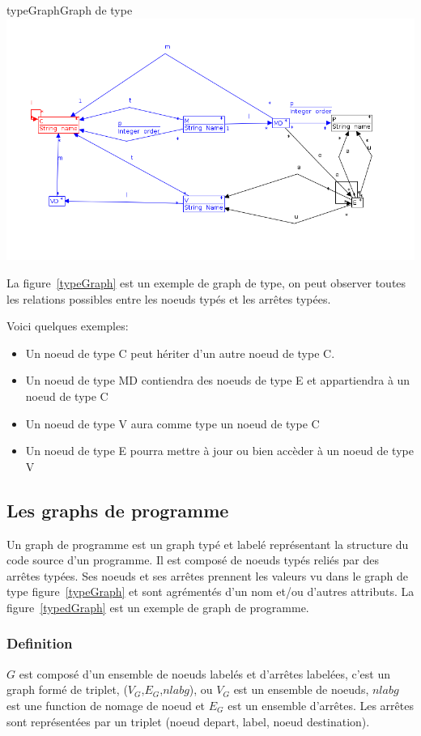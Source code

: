 \documentclass[a4paper, 12pt]{article}
\begin{document}
\begin{myfig}{typeGraph}{Graph de type}
\includegraphics[width=\textwidth]{typeGraph.png}
\end{myfig}

La figure~\ref{typeGraph} est un exemple de graph de type, on peut observer toutes les relations possibles entre les noeuds typés et les arrêtes typées.

Voici quelques exemples:
\begin{itemize}[label=\textbullet]
\item Un noeud de type C peut hériter d'un autre noeud de type C.
\item Un noeud de type MD contiendra des noeuds de type E et appartiendra à un noeud de type C
\item Un noeud de type V aura comme type un noeud de type C
\item Un noeud de type E pourra mettre à jour ou bien accèder à un noeud de type V
\end{itemize}


\subsection{Les graphs de programme} 

Un graph de programme est un graph typé et labelé représentant la structure du code source d'un programme. Il est composé de noeuds typés reliés par des arrêtes typées. Ses noeuds et ses arrêtes prennent les valeurs vu dans le graph de type figure~\ref{typeGraph} et sont agrémentés d'un nom et/ou d'autres attributs. La figure~\ref{typedGraph} est un exemple de graph de programme.

\subsubsection{Definition}
\(G \) est composé d'un ensemble de noeuds labelés et d'arrêtes labelées, c'est un graph formé de triplet, ({$V_G$},{$E_G$},\(nlabg \)), ou {$V_G$} est un ensemble de noeuds, \(nlabg \) est une function de nomage de noeud et {$E_G$} est un ensemble d'arrêtes. Les arrêtes sont représentées par un triplet (noeud depart, label, noeud destination).
\end{document}
